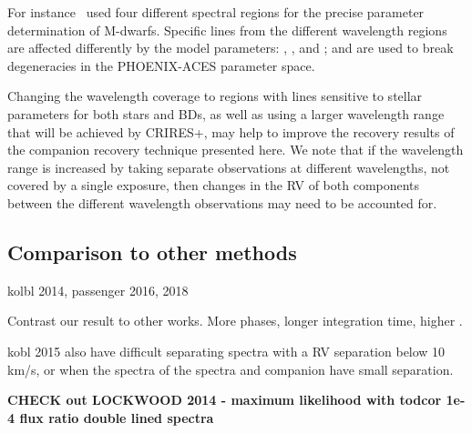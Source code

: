 For instance~\citet{passegger_fundamental_2016} used four different spectral regions for the precise parameter determination of M-dwarfs.
Specific lines from the different wavelength regions are affected differently by the model parameters: \Teff{}, \logg{}, and \feh{}; and are used to break degeneracies in the {PHOENIX-ACES} parameter space.

Changing the wavelength coverage to regions with lines sensitive to stellar parameters for both stars and BDs, as well as using a larger wavelength range that will be achieved by {CRIRES+}, may help to improve the recovery results of the companion recovery technique presented here.
We note that if the wavelength range is increased by taking separate observations at different wavelengths, not covered by a single exposure, then changes in the {RV} of both components between the different wavelength observations may need to be accounted for.



\subsection{Comparison to other methods}
kolbl 2014, passenger 2016, 2018

Contrast our result to other works.
More phases, longer integration time, higher {\snr{}}.



kobl 2015 also have difficult separating spectra with a {RV} separation below 10 km/s, or when the spectra of the spectra and companion have small separation.\todo{}


\textbf{
    CHECK out LOCKWOOD 2014 - maximum likelihood with todcor 1e-4 flux ratio double lined spectra}

